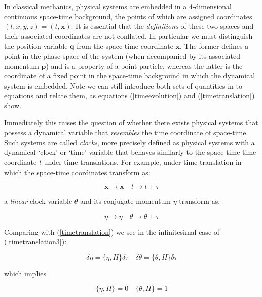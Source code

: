 \documentclass{article}
\begin{document}
In classical mechanics, physical systems are embedded in a 4-dimensional continuous space-time background, the points of which are assigned coordinates $(t,x,y,z) = (t, \boldsymbol{x})$.
It is essential that the \textit{definitions} of these two spaces and their associated coordinates are not conflated. In particular we must distinguish the position variable $\boldsymbol{q}$ from the space-time coordinate $\boldsymbol{x}$. The former defines a point in the phase space of the system (when accompanied by its associated momentum $\boldsymbol{p}$) and is a property of a point particle, whereas the latter is the coordinate of a fixed point in the space-time background in which the dynamical system is embedded. Note we can still introduce both sets of quantities in to equations and relate them, as equations (\ref{timeevolution}) and (\ref{timetranslation}) show.

Immediately this raises the question of whether there exists physical systems that possess a dynamical variable that \textit{resembles} the time coordinate of space-time. Such systems are called \textit{clocks}, more precisely defined as physical systems with a dynamical `clock' or `time' variable that behaves similarly to the space-time time coordinate $t$ under time translations. For example, under time translation in which the space-time coordinates transform as:

\begin{equation}
\boldsymbol{x} \rightarrow \boldsymbol{x} \quad t \rightarrow t+\tau
\label{timetranslation2}
\end{equation}

\noindent a \textit{linear} clock variable $\theta$ and its conjugate momentum $\eta$ transform as:

\begin{equation}
	\eta \rightarrow \eta \quad \theta \rightarrow \theta + \tau
	\label{timetranslation3}
\end{equation}

\noindent Comparing with (\ref{timetranslation}) we see in the infinitesimal case of (\ref{timetranslation3}):

\begin{equation}
	\delta\eta=\{\eta, H\}\delta\tau \quad \delta\theta = \{\theta, H\}\delta\tau
	\label{timetranslation4}
\end{equation}

\noindent which implies

\begin{equation}
	\{\eta, H\}=0 \quad \{\theta, H\}=1
	\label{timetranslation5}
\end{equation}
\end{document}
